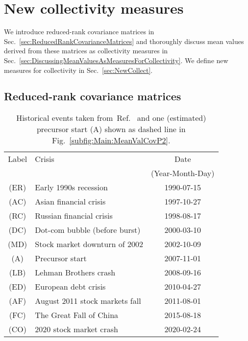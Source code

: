 \documentclass[aps, pra, groupedaddress, showkeys, twocolumn, floatfix, 10pt]{revtex4-2}
\begin{document}
\section{\label{sec:NewCollectivityMeasures}New collectivity measures}



We introduce reduced-rank covariance matrices in Sec.~\ref{sec:ReducedRankCovarianceMatrices} and thoroughly discuss  mean values derived from these matrices as collectivity measures in Sec.~\ref{sec:DiscussingMeanValuesAsMeasuresForCollectivity}. 
We define new measures for collectivity in Sec.~\ref{sec:NewCollect}.




\subsection{\label{sec:ReducedRankCovarianceMatrices}Reduced-rank covariance matrices}




%
\begin{table}[!htb]
	\centering
	\caption{\label{tab:FinancialCrises}
		Historical events taken 
		from~Ref.~\cite{wiki:2021:LISTSTOCKSCRASHES} and one (estimated) precursor start (A) shown as dashed line in Fig.~\ref{subfig:Main:MeanValCovP2}.
	}
	\begin{tabular}{cl@{\hspace{1em}}c}
		\toprule
		Label &
		Crisis &
		\multicolumn{1}{c}{Date}
		\\
		&
		&
		\multicolumn{1}{c}{(Year-Month-Day)} \\
		\midrule
		(ER) & Early 1990s recession & 1990-07-15 \\
		(AC) & Asian financial crisis & 1997-10-27 \\
		(RC) & Russian financial crisis & 1998-08-17 \\
		(DC) & Dot-com bubble (before burst) & 2000-03-10 \\
		(MD) & Stock market downturn of 2002 & 2002-10-09 \\
		(A) & Precursor start & 2007-11-01 \\
		(LB) & Lehman Brothers crash & 2008-09-16 \\
		(ED) & European debt crisis & 2010-04-27 \\
		(AF) & August 2011 stock markets fall & 2011-08-01 \\
		(FC) & The Great Fall of China & 2015-08-18 \\
		(CO) & 2020 stock market crash & 2020-02-24 \\
		\bottomrule
	\end{tabular}
\end{table}
%
\end{document}

